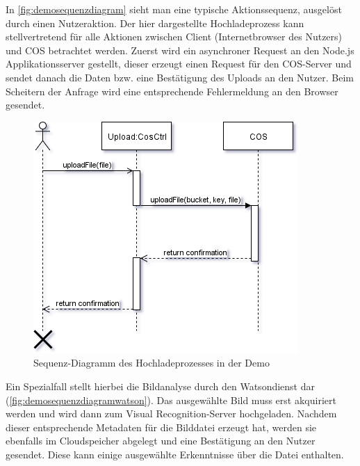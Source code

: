 In \autoref{fig:demosequenzdiagram} sieht man eine typische Aktionssequenz, ausgelöst durch einen Nutzeraktion. Der hier dargestellte Hochladeprozess kann stellvertretend für alle Aktionen zwischen Client (Internetbrowser des Nutzers) und \ac{COS} betrachtet werden.
Zuerst wird ein asynchroner Request an den Node.js Applikationsserver gestellt, dieser erzeugt einen Request für den \ac{COS}-Server und sendet danach die Daten bzw. eine Bestätigung des Uploads an den Nutzer.
Beim Scheitern der Anfrage wird eine entsprechende Fehlermeldung an den Browser gesendet.

\begin{figure}[hbt]
	\centering
	\includegraphics[scale=0.85]{images/demo-sequenz-diagram}
	\caption{Sequenz-Diagramm des Hochladeprozesses in der Demo}
	\label{fig:demosequenzdiagram}
\end{figure}

Ein Spezialfall stellt hierbei die Bildanalyse durch den Watsondienst dar (\autoref{fig:demosequenzdiagramwatson}). Das ausgewählte Bild muss erst akquiriert werden und wird dann zum Visual Recognition-Server hochgeladen. Nachdem dieser entsprechende Metadaten für die Bilddatei erzeugt hat, werden sie ebenfalls im Cloudspeicher abgelegt und eine Bestätigung an den Nutzer gesendet.
Diese kann einige ausgewählte Erkenntnisse über die Datei enthalten.

